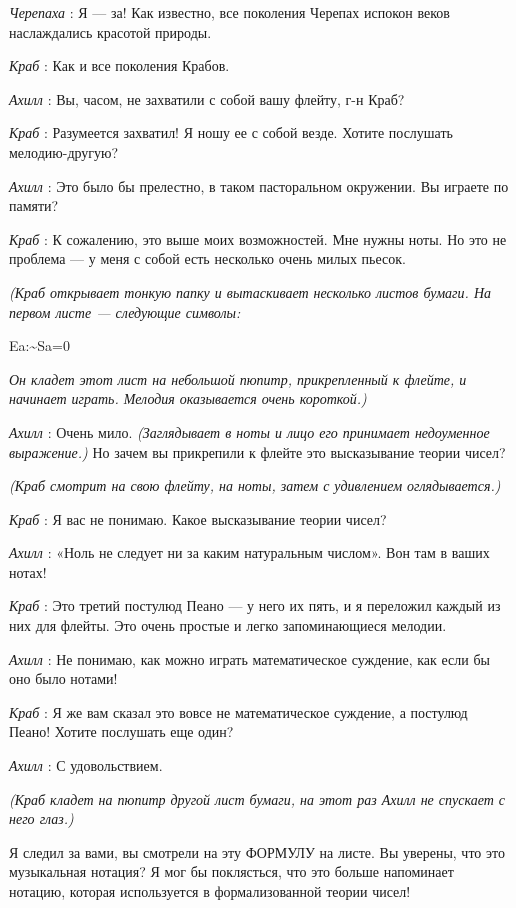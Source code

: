 \documentclass[../main.tex]{subfiles}
\begin{document}
\begin{dialogue}
\emph{Черепаха} : Я --- за! Как известно, все поколения Черепах испокон веков наслаждались красотой природы.

\emph{Краб} : Как и все поколения Крабов.

\emph{Ахилл} : Вы, часом, не захватили с собой вашу флейту, г-н Краб?

\emph{Краб} : Разумеется захватил! Я ношу ее с собой везде. Хотите послушать мелодию-другую?

\emph{Ахилл} : Это было бы прелестно, в таком пасторальном окружении. Вы играете по памяти?

\emph{Краб} : К сожалению, это выше моих возможностей. Мне нужны ноты. Но это не проблема --- у меня с собой есть несколько очень милых пьесок.

\emph{(Краб открывает тонкую папку и вытаскивает несколько листов бумаги. На первом листе --- следующие символы:}

Ea:\textasciitilde Sa=0

\emph{Он кладет этот лист на небольшой пюпитр, прикрепленный к флейте, и начинает играть. Мелодия оказывается очень короткой.)}

\emph{Ахилл} : Очень мило. \emph{(Заглядывает в ноты и лицо его принимает недоуменное выражение.)} Но зачем вы прикрепили к флейте это высказывание теории чисел?

\emph{(Краб смотрит на свою флейту, на ноты, затем с удивлением оглядывается.)}

\emph{Краб} : Я вас не понимаю. Какое высказывание теории чисел?

\emph{Ахилл} : «Ноль не следует ни за каким натуральным числом». Вон там в ваших нотах!

\emph{Краб} : Это третий постулюд Пеано --- у него их пять, и я переложил каждый из них для флейты. Это очень простые и легко запоминающиеся мелодии.

\emph{Ахилл} : Не понимаю, как можно играть математическое суждение, как если бы оно было нотами!

\emph{Краб} : Я же вам сказал это вовсе не математическое суждение, а постулюд Пеано! Хотите послушать еще один?

\emph{Ахилл} : С удовольствием.

\emph{(Краб кладет на пюпитр другой лист бумаги, на этот раз Ахилл не спускает с него глаз.)}

Я следил за вами, вы смотрели на эту ФОРМУЛУ на листе. Вы уверены, что это музыкальная нотация? Я мог бы поклясться, что это больше напоминает нотацию, которая используется в формализованной теории чисел!


\end{dialogue}
\end{document}
